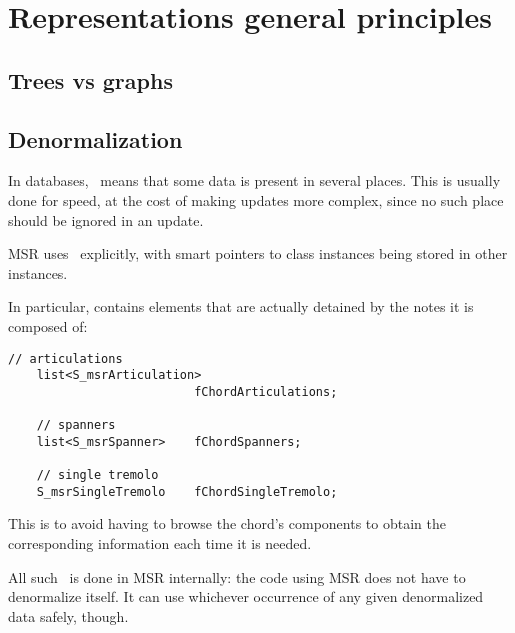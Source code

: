 
\chapter{Representations general principles}\label{Representations general principles}


\section{Trees vs graphs}

\section{Denormalization}

In databases, \denorm\ means that some data is present in several places. This is usually done for speed, at the cost of making updates more complex, since no such place should be ignored in an update.

MSR uses \denorm\ explicitly, with smart pointers to class instances being stored in other instances.

In particular,  contains elements that are actually detained by the notes it is composed of:
\begin{lstlisting}[language=CPlusPlus]
    // articulations
    list<S_msrArticulation>
                          fChordArticulations;

    // spanners
    list<S_msrSpanner>    fChordSpanners;

    // single tremolo
    S_msrSingleTremolo    fChordSingleTremolo;
\end{lstlisting}

This is to avoid having to browse the chord's components to obtain the corresponding information each time it is needed.

All such \denorm\ is done in MSR internally: the code using MSR does not have to denormalize itself.
It can use whichever occurrence of any given denormalized data safely, though.


